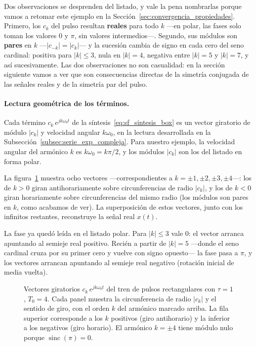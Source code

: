 \documentclass[class=book, crop=false]{standalone}
\begin{document}
Dos observaciones se desprenden del listado, y vale la pena
nombrarlas porque vamos a retomar este ejemplo en la
Sección~\ref{sec:convergencia_propiedades}. Primero, los $c_k$ del pulso
resultan \textbf{reales} para todo $k$ ---en polar, las fases solo
toman los valores $0$ y $\pi$, sin valores intermedios---. Segundo,
sus módulos son \textbf{pares} en $k$ ---$|c_{-k}| = |c_k|$--- y la
sucesión cambia de signo en cada cero del seno cardinal: positiva para
$|k| \leq 3$, nula en $|k| = 4$, negativa entre $|k|=5$ y $|k|=7$,
y así sucesivamente. Las dos observaciones no son casualidad: en la
sección siguiente vamos a ver que son consecuencias directas de la
simetría conjugada de las señales reales y de la simetría par del
pulso.

\paragraph{Lectura geométrica de los términos.}
Cada término $c_k\,e^{jk\omega_0 t}$ de la
síntesis~\eqref{eq:sf_sintesis_box} es un vector giratorio de
módulo $|c_k|$ y velocidad angular $k\omega_0$, en la lectura
desarrollada en la Subsección~\ref{subsec:serie_exp_compleja}. Para nuestro
ejemplo, la velocidad angular del armónico $k$ es
$k\omega_0 = k\pi/2$, y los módulos $|c_k|$ son los del listado en
forma polar.

La figura~\ref{fig:vectores_pulso} muestra ocho vectores
---correspondientes a $k = \pm 1, \pm 2, \pm 3, \pm 4$---: los de
$k>0$ giran antihorariamente sobre circunferencias de radio
$|c_k|$, y los de $k<0$ giran horariamente sobre circunferencias
del mismo radio (los módulos son pares en $k$, como acabamos de
ver). La superposición de estos vectores, junto con los infinitos
restantes, reconstruye la señal real $x(t)$.

La fase ya quedó leída en el listado polar. Para $|k| \leq 3$ vale
$0$: el vector arranca apuntando al semieje real positivo. Recién
a partir de $|k|=5$ ---donde el seno cardinal cruza por su primer cero y
vuelve con signo opuesto--- la fase pasa a $\pi$, y los vectores
arrancan apuntando al semieje real negativo (rotación inicial de
media vuelta).

\begin{figure}[H]
    \centering
    \begin{minipage}{\linewidth}
        \centering
        
        \caption{Vectores giratorios $c_k\,e^{jk\omega_0 t}$ del
                 tren de pulsos rectangulares con $\tau = 1$,
                 $T_0 = 4$. Cada panel muestra la circunferencia
                 de radio $|c_k|$ y el sentido de giro, con el
                 orden $k$ del armónico marcado arriba. La fila
                 superior corresponde a los $k$ positivos (giro
                 antihorario) y la inferior a los negativos (giro
                 horario). El armónico $k = \pm 4$ tiene módulo
                 nulo porque $\operatorname{sinc}(\pi) = 0$.}
        \label{fig:vectores_pulso}
    \end{minipage}
\end{figure}
\end{document}
